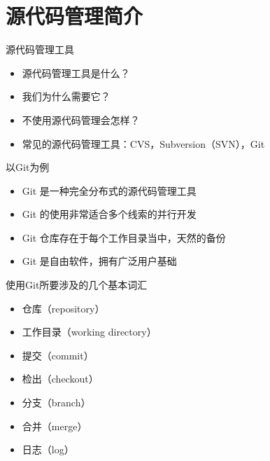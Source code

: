 \part{源代码管理简介}

\begin{frame}[<+->]{源代码管理工具}
  \begin{itemize}
    \item 源代码管理工具是什么？
    \item 我们为什么需要它？
    \item 不使用源代码管理会怎样？
    \item 常见的源代码管理工具：CVS，Subversion（SVN），Git
  \end{itemize}
\end{frame}


\begin{frame}[<+->]{以Git为例}
  \begin{itemize}
    \item Git 是一种完全分布式的源代码管理工具
    \item Git 的使用非常适合多个线索的并行开发
    \item Git 仓库存在于每个工作目录当中，天然的备份
    \item Git 是自由软件，拥有广泛用户基础 
  \end{itemize}
\end{frame}

\begin{frame}[<+->]{使用Git所要涉及的几个基本词汇}
  \begin{itemize}
    \item 仓库（repository）
    \item 工作目录（working directory）
    \item 提交（commit）
    \item 检出（checkout）
    \item 分支（branch）
    \item 合并（merge）
    \item 日志（log）
  \end{itemize}
\end{frame}

